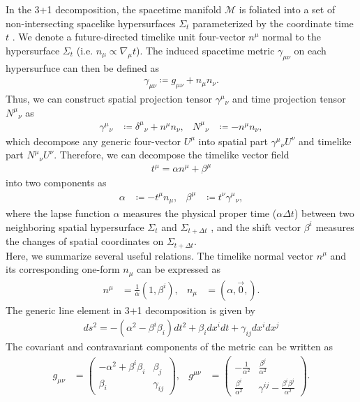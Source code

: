In the 3+1 decomposition, the spacetime manifold $\mathcal{M}$ is foliated into a set of non-intersecting spacelike hypersurfaces $\Sigma_t$ parameterized by the coordinate time $t$ \cite{misner1973gravitation}.
We denote a future-directed timelike unit four-vector $n^\mu$ normal to the hypersurface $\Sigma_t$ (i.e. $n_{\mu} \propto \nabla_\mu t$).
The induced spacetime metric $\gamma_{\mu\nu}$ on each hypersurfuce can then be defined as
\begin{align}\label{eq:1.2.spatial}
    \gamma_{\mu\nu} \coloneqq g_{\mu\nu} + n_{\mu} n_{\nu}.
\end{align}
Thus, we can construct spatial projection tensor $\gamma^{\mu}{}_{\nu}$ and time projection tensor $N^{\mu}{}_{\nu}$ as
\begin{align}
    \gamma^{\mu}{}_{\nu} &\coloneqq \delta^{\mu}{}_{\nu} + n^{\mu} n_{\nu}, & N^{\mu}{}_{\nu} &\coloneqq - n^{\mu} n_{\nu},
\end{align}
which decompose any generic four-vector $U^\mu$ into spatial part $\gamma^{\mu}{}_{\nu}U^{\nu}$ and timelike part $N^{\mu}{}_{\nu}U^{\nu}$.
Therefore, we can decompose the timelike vector field
\begin{align}\label{eq:1.2.1.normal_decompose}
t^\mu = \alpha n^{\mu} + \beta^{\mu}
\end{align}
into two components as
\begin{align}
    \alpha &\coloneqq - t^\mu n_\mu, & \beta^{\mu} &\coloneqq t^{\nu} \gamma^{\mu}{}_{\nu},
\end{align}
where the lapse function $\alpha$ measures the physical proper time ($\alpha\Delta t$) between two neighboring spatial hypersurface $\Sigma_t$ and $\Sigma_{t+\Delta t}$
, and the shift vector $\beta^i$ measures the changes of spatial coordinates on $\Sigma_{t+\Delta t}$.\\
Here, we summarize several useful relations.
The timelike normal vector $n^\mu$ and its corresponding one-form $n_\mu$ can be expressed as
\begin{align} \label{eq:1.2.1.normal}
    n^\mu &= \frac{1}{\alpha}\left(1, \beta^i \right), & n_\mu &= \left(\alpha, \vec{0}, \right).
\end{align}
The generic line element in 3+1 decomposition is given by
\begin{align}
    ds^2 = - \left( \alpha^2 - \beta^i \beta_i \right) dt^2 + \beta_i dx^i dt + \gamma_{ij} dx^i dx^j
\end{align}
The covariant and contravariant components of the metric can be written as
\begin{align}\label{eq:1.2.1.g}
    g_{\mu\nu} &= 
    \begin{pmatrix}
        - \alpha^2 + \beta^i \beta_i & \beta_j \\
        \beta_i & \gamma_{ij}
    \end{pmatrix}, &
    g^{\mu\nu} &= 
    \begin{pmatrix}
        - \frac{1}{\alpha^2} & \frac{\beta^j}{\alpha^2} \\
        \frac{\beta^i}{\alpha^2} & \gamma^{ij} - \frac{\beta^i \beta^j}{\alpha^2}
    \end{pmatrix}.
\end{align}
